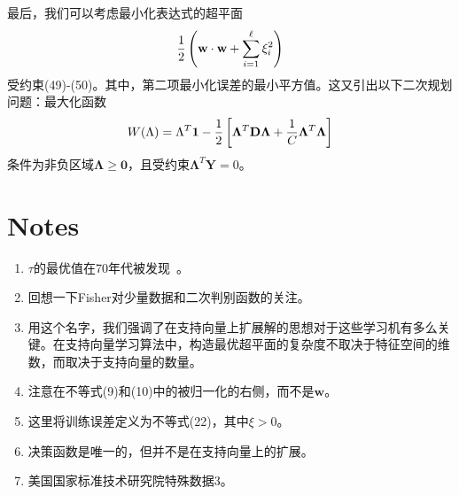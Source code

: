 \documentclass[lang=cn,11pt,a4paper]{elegantpaper}
\newcommand{\upcite}[1]{\textsuperscript{\textsuperscript{\cite{#1}}}}
\begin{document}
	最后，我们可以考虑最小化表达式的超平面
	\begin{equation}
		\frac{1}{2}\left(\mathbf{w} \cdot \mathbf{w}+\sum_{i=1}^{\ell} \xi_{i}^{2}\right)\notag
	\end{equation}
	受约束(49)-(50)。其中，第二项最小化误差的最小平方值。这又引出以下二次规划问题：最大化函数
	\begin{equation}
		W(\Lambda)=\Lambda^{T} \mathbf{1}-\frac{1}{2}\left[\mathbf{\Lambda}^{T} \mathbf{D} \mathbf{\Lambda}+\frac{1}{C} \mathbf{\Lambda}^{T} \mathbf{\Lambda}\right]\notag
	\end{equation}
	条件为非负区域$\mathbf{\Lambda}\geq\mathbf{0}$，且受约束$\mathbf{\Lambda}^T\mathbf{Y}=0$。

	\section*{Notes}
	\begin{enumerate}
		\item $\tau$的最优值在70年代被发现~\upcite{anderson1962classification}。
		\item 回想一下Fisher对少量数据和二次判别函数的关注。
		\item 用这个名字，我们强调了在支持向量上扩展解的思想对于这些学习机有多么关键。在支持向量学习算法中，构造最优超平面的复杂度不取决于特征空间的维数，而取决于支持向量的数量。
		\item 注意在不等式(9)和(10)中的被归一化的右侧，而不是$\mathbf{w}$。
		\item 这里将训练误差定义为不等式(22)，其中$\xi>0$。
		\item 决策函数是唯一的，但并不是在支持向量上的扩展。
		\item 美国国家标准技术研究院特殊数据3。
	\end{enumerate}

	
\end{document}
